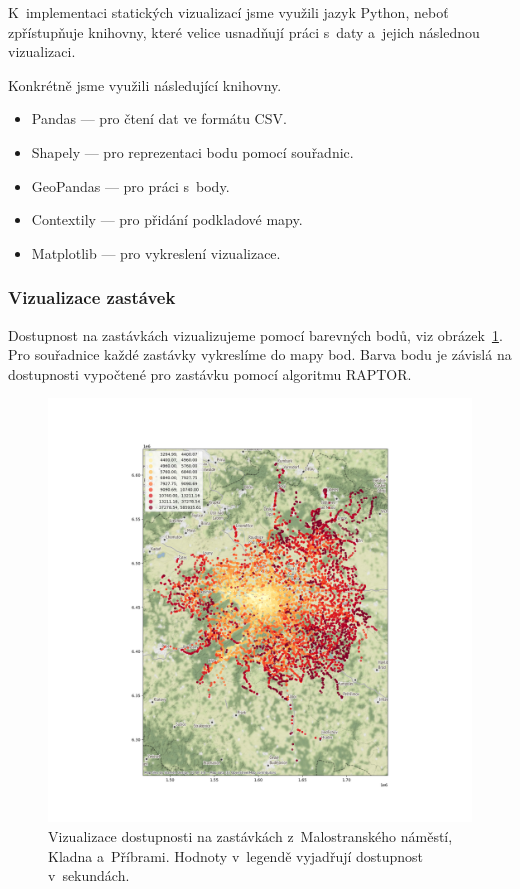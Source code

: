 K~implementaci statických vizualizací jsme využili jazyk Python, neboť zpřístupňuje knihovny, které velice usnadňují práci s~daty a~jejich následnou vizualizaci.

Konkrétně jsme využili následující knihovny.

\begin{itemize}
    \item Pandas --- pro čtení dat ve formátu CSV.
    \item Shapely --- pro reprezentaci bodu pomocí souřadnic. 
    \item GeoPandas --- pro práci s~body.
    \item Contextily --- pro přidání podkladové mapy.
    \item Matplotlib --- pro vykreslení vizualizace.
\end{itemize}

\subsubsection{Vizualizace zastávek}

Dostupnost na zastávkách vizualizujeme pomocí barevných bodů, viz obrázek~\ref{fig:gtfs-mostAccessibleStop}. Pro souřadnice každé zastávky vykreslíme do mapy bod. Barva bodu je závislá na dostupnosti vypočtené pro zastávku pomocí algoritmu RAPTOR.

\begin{figure}[ht]
    \centering
    \includegraphics[width=\textwidth]{../img/staticStopsVisualization.png}
    \caption{Vizualizace dostupnosti na zastávkách z~Malostranského náměstí, Kladna a~Příbrami. Hodnoty v~legendě vyjadřují dostupnost v~sekundách.}
    \label{fig:gtfs-mostAccessibleStop}
\end{figure}

